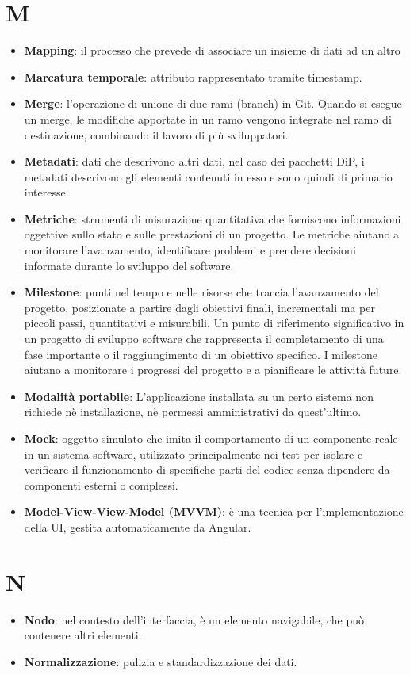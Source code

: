\documentclass[a4paper,12pt]{article}
\begin{document}
\section{M}
\begin{itemize}
    \item \textbf{Mapping}: il processo che prevede di associare un insieme di dati ad un altro
    \item \textbf{Marcatura temporale}: attributo rappresentato tramite timestamp.
    \item \textbf{Merge}: l'operazione di unione di due rami (branch) in Git. Quando si esegue un merge, le modifiche apportate in un ramo vengono integrate nel ramo di destinazione, combinando il lavoro di più sviluppatori.
    \item \textbf{Metadati}: dati che descrivono altri dati, nel caso dei pacchetti DiP, i metadati descrivono gli elementi contenuti in esso e sono quindi di primario interesse.
    \item \textbf{Metriche}: strumenti di misurazione quantitativa che forniscono informazioni oggettive sullo stato e sulle prestazioni di un progetto. Le metriche aiutano a monitorare l'avanzamento, identificare problemi e prendere decisioni informate durante lo sviluppo del software.
    \item \textbf{Milestone}: punti nel tempo e nelle risorse che traccia l'avanzamento del progetto, posizionate a partire dagli obiettivi finali, incrementali ma per piccoli passi, quantitativi e misurabili. Un punto di riferimento significativo in un progetto di sviluppo software che rappresenta il completamento di una fase importante o il raggiungimento di un obiettivo specifico. I milestone aiutano a monitorare i progressi del progetto e a pianificare le attività future.
    \item \textbf{Modalità portabile}: L'applicazione installata su un certo sistema non richiede nè installazione, nè permessi amministrativi da quest'ultimo.
    \item \textbf{Mock}: oggetto simulato che imita il comportamento di un componente reale in un sistema software, utilizzato principalmente nei test per isolare e verificare il funzionamento di specifiche parti del codice senza dipendere da componenti esterni o complessi.
    \item \textbf{Model-View-View-Model (MVVM)}: è una tecnica per l'implementazione della UI, gestita automaticamente da Angular. 
\end{itemize}
\section{N}
    \begin{itemize}
        \item \textbf{Nodo}: nel contesto dell'interfaccia, è un elemento navigabile, che può contenere altri elementi.
        \item \textbf{Normalizzazione}: pulizia e standardizzazione dei dati.
    \end{itemize}
\end{document}
